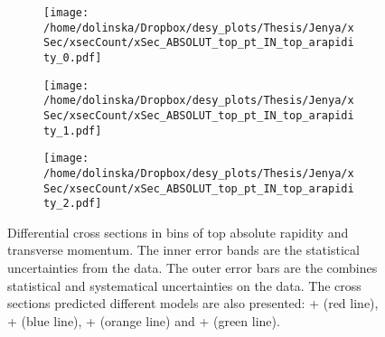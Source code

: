 \begin{figure}[p]
\centering
\begin{subfigure}
  \centering
  \texttt{[image: /home/dolinska/Dropbox/desy\_plots/Thesis/Jenya/xSec/xsecCount/xSec\_ABSOLUT\_top\_pt\_IN\_top\_arapidity\_0.pdf]}
\end{subfigure}
\begin{subfigure}
  \centering
  \texttt{[image: /home/dolinska/Dropbox/desy\_plots/Thesis/Jenya/xSec/xsecCount/xSec\_ABSOLUT\_top\_pt\_IN\_top\_arapidity\_1.pdf]}
\end{subfigure}
\begin{subfigure}
  \centering
  \texttt{[image: /home/dolinska/Dropbox/desy\_plots/Thesis/Jenya/xSec/xsecCount/xSec\_ABSOLUT\_top\_pt\_IN\_top\_arapidity\_2.pdf]}
\end{subfigure}
\caption{Differential cross sections in bins of top absolute rapidity and transverse momentum. The inner error bands are the statistical uncertainties from the data.
         The outer error bars are the combines statistical and systematical uncertainties on the data. The cross sections predicted different models are also presented:
         \MG + \PYTHIA (red line), \Powheg + \PYTHIA (blue line), \Powheg + \HERWIG (orange line) and \MCNLO + \HERWIG (green line).}
\label{fig:XSU_2D_y_pt}
\end{figure}
